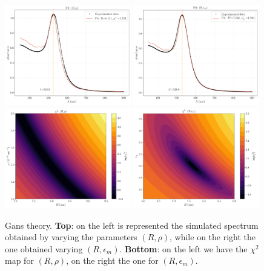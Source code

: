 \documentclass[prb,twocolumn]{revtex4-1}
\begin{document}
\begin{figure}[t!]
    \centering 
    \includegraphics[width=0.49\textwidth]{images/os/1_fit_GANS.pdf}
    \hskip 1mm
   \includegraphics[width=0.49\textwidth]{images/os/2_fit_GANS.pdf}
    \\
    \includegraphics[width=0.49\textwidth]{images/os/1_chisquare_GANS.pdf}
   \hskip 1mm
   \includegraphics[width=0.49\textwidth]{images/os/2_chisquare_GANS.pdf}
    \caption{Gans theory. \textbf{Top}: on the left is represented the simulated spectrum obtained by varying the parameters $(R,\rho)$, while on the right the one obtained varying $(R,\epsilon_m)$. \textbf{Bottom}: on the left we have the $\chi^2$ map for $(R,\rho)$, on the right the one for $(R,\epsilon_m)$. }
    \label{fig:optical_results_GANS}
\end{figure}
\end{document}
